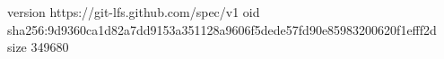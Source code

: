 version https://git-lfs.github.com/spec/v1
oid sha256:9d9360ca1d82a7dd9153a351128a9606f5dede57fd90e85983200620f1efff2d
size 349680

